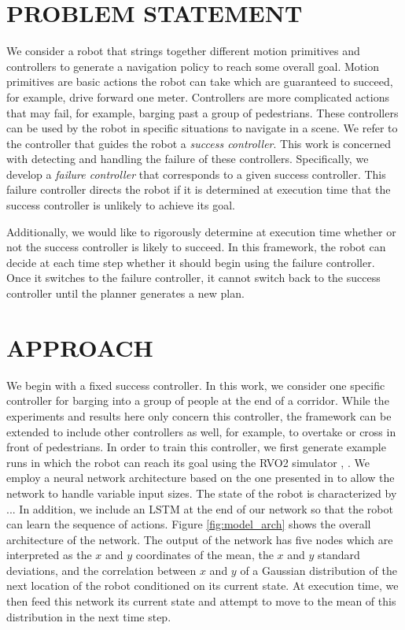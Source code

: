 \documentclass[letterpaper, 10 pt, conference]{ieeeconf}  %
\begin{document}
\section{PROBLEM STATEMENT}\label{sec:problemstatement}
	We consider a robot that strings together different motion primitives and controllers to generate a navigation policy to reach some overall goal. Motion primitives are basic actions the robot can take which are guaranteed to succeed, for example, drive forward one meter. Controllers are more complicated actions that may fail, for example, barging past a group of pedestrians. These controllers can be used by the robot in specific situations to navigate in a scene. We refer to the controller that guides the robot a \textit{success controller}. This work is concerned with detecting and handling the failure of these controllers. Specifically, we develop a \textit{failure controller} that corresponds to a given success controller. This failure controller directs the robot if it is determined at execution time that the success controller is unlikely to achieve its goal. 
	
	Additionally, we would like to rigorously determine at execution time whether or not the success controller is likely to succeed. In this framework, the robot can decide at each time step whether it should begin using the failure controller. Once it switches to the failure controller, it cannot switch back to the success controller until the planner generates a new plan. 
		
\section{APPROACH}\label{sec:approach}
	We begin with a fixed success controller. In this work, we consider one specific controller for barging into a group of people at the end of a corridor. While the experiments and results here only concern this controller, the framework can be extended to include other controllers as well, for example, to overtake or cross in front of pedestrians. In order to train this controller, we first generate example runs in which the robot can reach its goal using the RVO2 simulator \cite{rvo2}, \cite{pyrvo2}. We employ a neural network architecture based on the one presented in \cite{crowdawarerl} to allow the network to handle variable input sizes. The state of the robot is characterized by ... In addition, we include an LSTM at the end of our network so that the robot can learn the sequence of actions. Figure \ref{fig:model_arch} shows the overall architecture of the network. The output of the network has five nodes which are interpreted as the $x$ and $y$ coordinates of the mean, the $x$ and $y$ standard deviations, and the correlation between $x$ and $y$ of a Gaussian distribution of the next location of the robot conditioned on its current state. At execution time, we then feed this network its current state and attempt to move to the mean of this distribution in the next time step.
	
\end{document}
